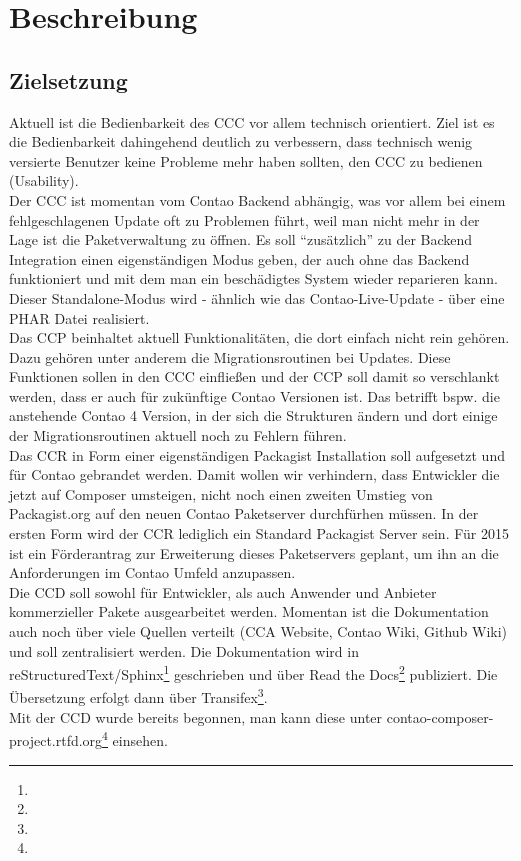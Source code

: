 \documentclass[
paper=a4,
draft=false,%
fontsize=10pt%
]{scrartcl}
\begin{document}
%
%

\newpage

\section{Beschreibung}

\subsection{Zielsetzung}

Aktuell ist die Bedienbarkeit des CCC vor allem technisch orientiert. Ziel ist es die Bedienbarkeit dahingehend deutlich zu verbessern, dass technisch wenig versierte Benutzer keine Probleme mehr haben sollten, den CCC zu bedienen (Usability).\\
Der CCC ist momentan vom Contao Backend abhängig, was vor allem bei einem fehlgeschlagenen Update oft zu Problemen führt, weil man nicht mehr in der Lage ist die Paketverwaltung zu öffnen. Es soll “zusätzlich” zu der Backend Integration einen eigenständigen Modus geben, der auch ohne das Backend funktioniert und mit dem man ein beschädigtes System wieder reparieren kann. Dieser Standalone-Modus wird - ähnlich wie das Contao-Live-Update - über eine PHAR Datei realisiert.\\
Das CCP beinhaltet aktuell Funktionalitäten, die dort einfach nicht rein gehören. Dazu gehören unter anderem die Migrationsroutinen bei Updates. Diese Funktionen sollen in den CCC einfließen und der CCP soll damit so verschlankt werden, dass er auch für zukünftige Contao Versionen ist. Das betrifft bspw. die anstehende Contao 4 Version, in der sich die Strukturen ändern und dort einige der Migrationsroutinen aktuell noch zu Fehlern führen.\\
Das CCR in Form einer eigenständigen Packagist Installation soll aufgesetzt und für Contao gebrandet werden. Damit wollen wir verhindern, dass Entwickler die jetzt auf Composer umsteigen, nicht noch einen zweiten Umstieg von Packagist.org auf den neuen Contao Paketserver durchfürhen müssen. In der ersten Form wird der CCR lediglich ein Standard Packagist Server sein. Für 2015 ist ein Förderantrag zur Erweiterung dieses Paketservers geplant, um ihn an die Anforderungen im Contao Umfeld anzupassen.\\
Die CCD soll sowohl für Entwickler, als auch Anwender und Anbieter kommerzieller Pakete ausgearbeitet werden. Momentan ist die Dokumentation auch noch über viele Quellen verteilt (CCA Website, Contao Wiki, Github Wiki) und soll zentralisiert werden. Die Dokumentation wird in reStructuredText/Sphinx\footnote{} geschrieben und über Read the Docs\footnote{} publiziert. Die Übersetzung erfolgt dann über Transifex\footnote{}.\\
Mit der CCD wurde bereits begonnen, man kann diese unter contao-composer-project.rtfd.org\footnote{} einsehen.
\end{document}
